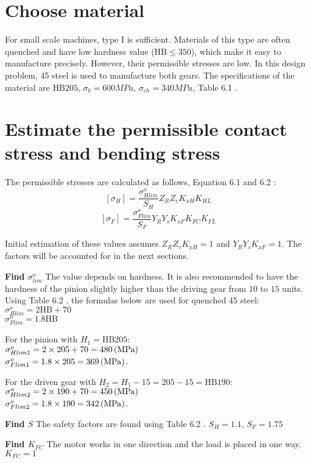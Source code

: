 \section{Choose material}
For small scale machines, type I is sufficient. Materials of this type  are often quenched and have low hardness value ($ \text{HB}\leq 350 $), which make it easy to manufacture precisely.  However, their permissible stresses are low. In this design problem, 45 steel  is used to manufacture both gears.  The specifications of the material are $ \text{HB} 205 $, $ \sigma_b = 600\unit{MPa} $, $ \sigma_{ch} = 340 \unit{MPa}$, Table 6.1  \cite{tk1}.

\section{Estimate the permissible contact stress and bending stress}
The permissible stresses are calculated as follows, Equation 6.1 and 6.2 \cite{tk1}:
\[[\sigma_H]=\dfrac{\sigma_{Hlim}^o}{S_H}Z_RZ_vK_{xH}K_{HL}\]
\[[\sigma_{F}]=\dfrac{\sigma_{Flim}^o}{S_F}Y_RY_sK_{xF}K_{FC}K_{FL}\]

Initial estimation of these values assumes $ Z_RZ_vK_{xH} = 1 $ and $ Y_RY_sK_{xF} = 1 $. The factors will be accounted for in the next sections.

\textbf{Find $ \sigma_{lim}^o $} The value depends on hardness. It is also recommended to have the hardness of the pinion slightly higher than the driving gear from $ 10 $ to $ 15 $ units. Using Table 6.2 \cite{tk1}, the formulas below are used for quenched 45 steel:\\
$ \sigma_{Hlim}^o = 2\text{HB} + 70$\\
$ \sigma_{Flim}^o = 1.8\text{HB} $

For the pinion with $ H_1=\text{HB}205$:\\
$ \sigma_{Hlim1}^o = 2 \times 205 + 70 = 480 \, (\mathrm{MPa})$\\
$ \sigma_{Flim1}^o = 1.8\times 205 = 369 \, (\mathrm{MPa})$.

For the driven gear with $ H_2=H_1-15=205-15=\text{HB}190 $:\\
$ \sigma_{Hlim2}^o = 2 \times 190 + 70 = 450 \, (\mathrm{MPa})$\\
$ \sigma_{Flim2}^o = 1.8\times 190 = 342 \, (\mathrm{MPa})$.

\textbf{Find $ S $} The safety factors are found using Table 6.2 \cite{tk1}. $ S_H=1.1 $, $ S_F=1.75 $

\textbf{Find $ K_{FC} $} The motor works in one direction and the load is placed in one way. $ K_{FC} = 1$

